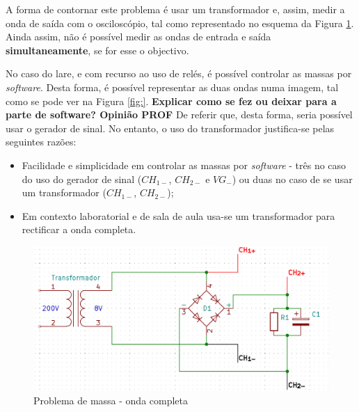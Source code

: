 A forma de contornar este problema é usar um transformador e, assim, medir a onda de saída com o osciloscópio, tal como representado no esquema da Figura \ref{fig:ondacompleta-massa}. Ainda assim, não é possível medir as ondas de entrada e saída \textbf{simultaneamente}, se for esse o objectivo.

No caso do \acrshort{lare}, e com recurso ao uso de relés, é possível controlar as massas por \textit{software}. Desta forma, é possível representar as duas ondas numa imagem, tal como se pode ver na Figura \ref{fig:}. \textbf{Explicar como se fez ou deixar para a parte de software? Opinião PROF}
De referir que, desta forma, seria possível usar o gerador de sinal. No entanto, o uso do transformador justifica-se pelas seguintes razões:
\begin{itemize}
	\item Facilidade e simplicidade em controlar as massas por \textit{software} - três no caso do uso do gerador de sinal ($CH_{1-}$, $CH_{2-}$ e $VG_{-}$) ou duas no caso de se usar um transformador ($CH_{1-}$, $CH_{2-}$);
	\item Em contexto laboratorial e de sala de aula usa-se um transformador para rectificar a onda completa.
\end{itemize}


\begin{figure}[hbtp]
	\centering
	\includegraphics[width=1\textwidth]{figures/sch-ondacompleta-massa.png}
	\caption{Problema de massa - onda completa}
	\label{fig:ondacompleta-massa}
\end{figure}

